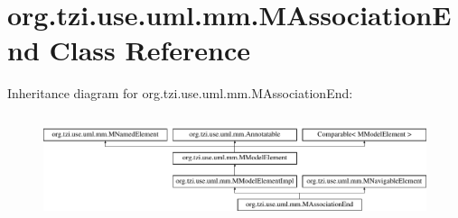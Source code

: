 \hypertarget{classorg_1_1tzi_1_1use_1_1uml_1_1mm_1_1_m_association_end}{\section{org.\-tzi.\-use.\-uml.\-mm.\-M\-Association\-End Class Reference}
\label{classorg_1_1tzi_1_1use_1_1uml_1_1mm_1_1_m_association_end}
}
Inheritance diagram for org.\-tzi.\-use.\-uml.\-mm.\-M\-Association\-End\-:\begin{figure}[H]
\begin{center}
\leavevmode
\includegraphics[height=3.111111cm]{classorg_1_1tzi_1_1use_1_1uml_1_1mm_1_1_m_association_end}
\end{center}
\end{figure}
